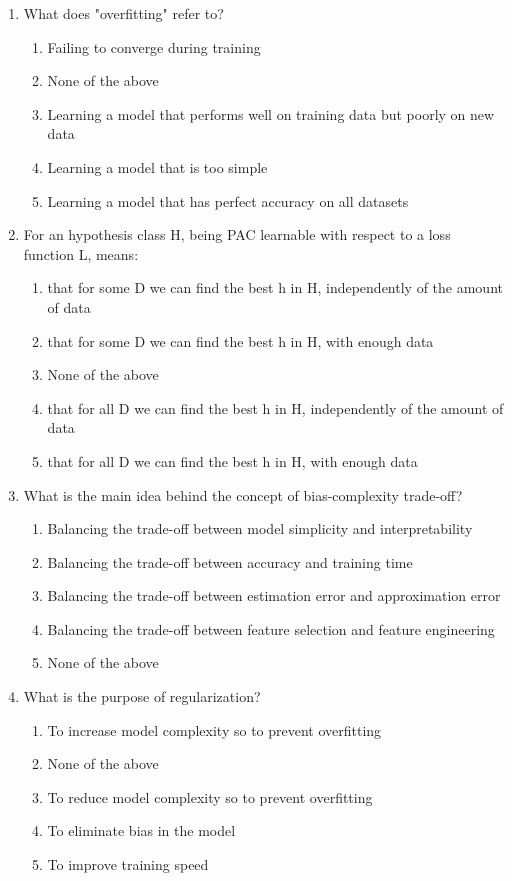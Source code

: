 \documentclass[a4paper,11pt,oneside]{book}
\begin{document}
\begin{enumerate}
    \clearpage
    \item What does "overfitting" refer to?
    \begin{enumerate}[label=\alph*)]
        \item Failing to converge during training
        \item None of the above
        \item Learning a model that performs well on training data but poorly on new data
        \item Learning a model that is too simple
        \item Learning a model that has perfect accuracy on all datasets
    \end{enumerate}

    \item For an hypothesis class H, being PAC learnable with respect to a loss function L, means:
    \begin{enumerate}[label=\alph*)]
        \item that for some D we can find the best h in H, independently of the amount of data
        \item that for some D we can find the best h in H, with enough data
        \item None of the above
        \item that for all D we can find the best h in H, independently of the amount of data
        \item that for all D we can find the best h in H, with enough data
    \end{enumerate}

    \item What is the main idea behind the concept of bias-complexity trade-off?
    \begin{enumerate}[label=\alph*)]
        \item Balancing the trade-off between model simplicity and interpretability
        \item Balancing the trade-off between accuracy and training time
        \item Balancing the trade-off between estimation error and approximation error
        \item Balancing the trade-off between feature selection and feature engineering
        \item None of the above
    \end{enumerate}

    \item What is the purpose of regularization?
    \begin{enumerate}[label=\alph*)]
        \item To increase model complexity so to prevent overfitting
        \item None of the above
        \item To reduce model complexity so to prevent overfitting
        \item To eliminate bias in the model
        \item To improve training speed
    \end{enumerate}


\end{enumerate}
\end{document}
